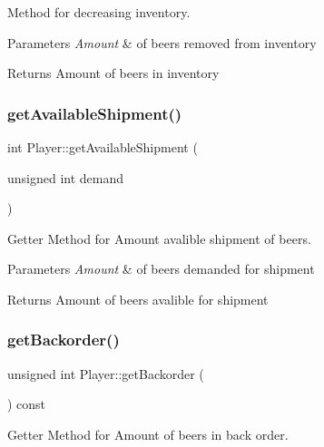 Method for decreasing inventory. 


\begin{DoxyParams}{Parameters}
{\em Amount} & of beers removed from inventory \\
\hline
\end{DoxyParams}
\begin{DoxyReturn}{Returns}
Amount of beers in inventory 
\end{DoxyReturn}
\mbox{\label{classPlayer_a5e1a112bbb49e2896aa71aa8ffa02e90}} 
\subsubsection{\texorpdfstring{get\+Available\+Shipment()}{getAvailableShipment()}}
{\footnotesize\ttfamily int Player\+::get\+Available\+Shipment (\begin{DoxyParamCaption}\item[{unsigned int}]{demand }\end{DoxyParamCaption})}



Getter Method for Amount avalible shipment of beers. 


\begin{DoxyParams}{Parameters}
{\em Amount} & of beers demanded for shipment \\
\hline
\end{DoxyParams}
\begin{DoxyReturn}{Returns}
Amount of beers avalible for shipment 
\end{DoxyReturn}
\mbox{\label{classPlayer_a538ba7ec623afd550c37783c10957c3d}} 
\subsubsection{\texorpdfstring{get\+Backorder()}{getBackorder()}}
{\footnotesize\ttfamily unsigned int Player\+::get\+Backorder (\begin{DoxyParamCaption}{ }\end{DoxyParamCaption}) const}



Getter Method for Amount of beers in back order. 

